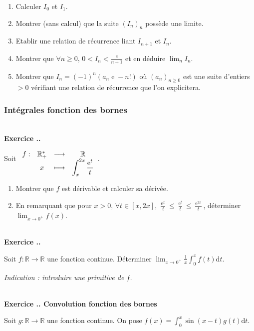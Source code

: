\documentclass{article}
\newcommand{\fonction}[5]{\raisebox{-0.5\baselineskip}{$\begin{array}{lccc}
    #1: & #2 & \longrightarrow & #3 \\
        & #4 & \longmapsto & #5 \end{array}$}}
\newcommand{\di}{\mathrm{d}}
\newcommand{\ex}{{\operatorname{e}}}
\newcommand{\mb}[1]{\mathbb{#1}}
\newcounter{exo}
\newcommand{\exercice}[1][\null]{\textbf{\\ Exercice \thesection.\theexo. #1} \addtocounter{exo}{1}}
\begin{document}
\begin{enumerate}

\item Calculer $I_0$ et $I_1$.

\item Montrer (sans calcul) que la suite $(I_n)_n$ possède une limite.

\item Etablir une relation de récurrence liant $I_{n+1}$ et $I_n$.

\item Montrer que $\forall n \ge 0$, $0<I_n<\frac{e}{n+1}$ et en déduire $\lim_n I_n$.

\item Montrer que $I_n = (-1)^n(a_n \ex - n!)$ où $(a_n)_{n \ge 0}$ est une suite d'entiers $>0$ vérifiant une relation de récurrence que l'on explicitera.

\end{enumerate}


\subsubsection{Intégrales fonction des bornes}


\exercice

Soit $ \fonction{f}{\mb{R^*_+}}{\mb{R}}{x}{\displaystyle \int_x^{2x} \frac{\ex^t}{t}}$.

\begin{enumerate}

\item Montrer que $f$ est dérivable et calculer sa dérivée.

\item En remarquant que pour $x>0$, $\forall t \in [x,2x]$, $\displaystyle \frac{\ex^x}{t} \le \frac{\ex^t}{t} \le \frac{\ex^{2x}}{t} $, déterminer $\displaystyle \lim_{x \rightarrow 0^+} f(x)$.

\end{enumerate}

\exercice

Soit $f : \mb{R} \rightarrow \mb{R}$ une fonction continue. Déterminer $\displaystyle \lim_{x \rightarrow 0^+} \frac{1}{x} \int_0^x f(t) \di t$.

\emph{Indication : introduire une primitive de $f$.}



\exercice[Convolution fonction des bornes]

Soit $g : \mb{R} \rightarrow \mb{R}$ une fonction continue. On pose $f(x) = \displaystyle \int_0^x \sin(x-t) g(t) \di t$.
\end{document}
